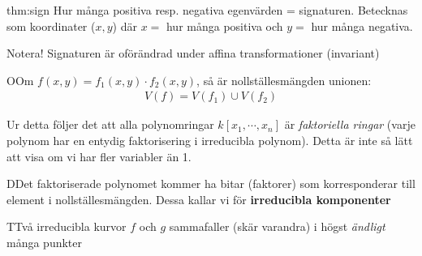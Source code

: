 \par\bigskip
\begin{theo}{thm:sign}
  Hur många positiva resp. negativa egenvärden = signaturen. Betecknas som koordinater ($x,y$) där $x=$ hur många positiva och $y=$ hur många negativa.
  \par\bigskip
  \noindent Notera! Signaturen är oförändrad under affina transformationer (invariant)
\end{theo}
\par\bigskip
\begin{theo}
  OOm $f(x,y) = f_1(x,y)\cdot f_2(x,y)$, så är nollställesmängden unionen:
  \begin{equation*}
    \begin{gathered}
      V(f) = V(f_1)\cup V(f_2)
    \end{gathered}
  \end{equation*}
\end{theo}
\par\bigskip
\noindent Ur detta följer det att alla polynomringar $k[x_1,\cdots,x_n]$ är \textit{faktoriella ringar} (varje polynom har en entydig faktorisering i irreducibla polynom). Detta är inte så lätt att visa om vi har fler variabler än 1.
\par\bigskip
\begin{theo}
  DDet faktoriserade polynomet kommer ha bitar (faktorer) som korresponderar till element i nollställesmängden. Dessa kallar vi för \textbf{irreducibla komponenter}
\end{theo}
\par\bigskip
\begin{theo}
  TTvå irreducibla kurvor $f$ och $g$ sammafaller (skär varandra) i högst \textit{ändligt} många punkter
\end{theo}
